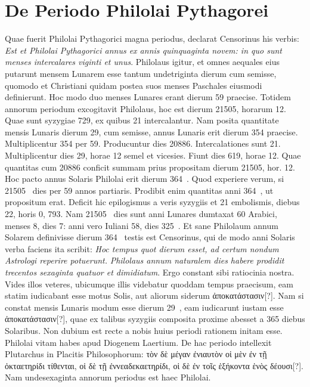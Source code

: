 \section{De Periodo Philolai Pythagorei}
%
Quae fuerit Philolai Pythagorici magna periodus, declarat
Censorinus his verbis: \textit{Est et Philolai Pythagorici annus ex
annis quinquaginta novem: in quo sunt menses intercalares viginti
et unus}.
Philolaus igitur, et omnes aequales eius putarunt mensem
Lunarem esse tantum undetriginta dierum cum semisse, quomodo
et Christiani quidam postea suos menses Paschales eiusmodi definierunt.
Hoc modo duo menses Lunares erant dierum 59 praecise.
Totidem annorum periodum excogitavit Philolaus, hoc est dierum
21505, horarum 12.
Quae sunt syzygiae 729, ex quibus 21 intercalantur.
Nam posita quantitate mensis Lunaris dierum 29, cum semisse,
annus Lunaris erit dierum 354 praecise.
Multiplicentur 354
per 59.
Producuntur dies 20886.
Intercalationes sunt 21.
Multiplicentur
dies 29, horae 12 semel et vicesies.
Fiunt dies 619, horae
12.
Quae quantitas cum 20886 conficit summam prius propositam
dierum 21505, hor. 12. %
Hoc pacto annus Solaris Philolai erit dierum
364~.
Quod experiere verum, si 21505~ dies per 59 annos
partiaris.
Prodibit enim quantitas anni 364~, ut propositum erat.
Deficit hic epilogismus a veris syzygiis et 21 embolismis, diebus
22, horis 0, 793.
Nam 21505~ dies sunt anni Lunares dumtaxat
60 Arabici, menses 8, dies 7: anni vero Iuliani 58, dies 325~.
Et sane Philolaum annum Solarem definivisse dierum 364~
testis est Censorinus, qui de modo anni Solaris verba faciens ita scribit:
\textit{Hoc tempus quot dierum esset, ad certum nondum Astrologi reperire
potuerunt.}
\textit{Philolaus annum naturalem dies habere prodidit trecentos
sexaginta quatuor et dimidiatum}.
Ergo constant sibi ratiocinia nostra.
Vides illos veteres, ubicumque illis videbatur quoddam
tempus praecisum, eam statim iudicabant esse motus Solis,
aut aliorum siderum \textgreek{ἀποκατάστασιν[?]}.
%
Nam si constat mensis Lunaris
modum esse dierum 29~, eam iudicarunt iustam esse
 \textgreek{ἀποκατάστασιν[?]},
quae ex talibus syzygiis composita proxime abesset a 365 diebus Solaribus.
Non dubium est recte a nobis huius periodi rationem initam
esse.
Philolai vitam habes apud Diogenem Laertium.
De hac periodo
intellexit Plutarchus in Placitis Philosophorum: \textgreek{τὸν δὲ μέγαν
ἐνιαυτὸν οἱ μὲν ἐν τῇ ὀκταετηρίδι τίθενται, οἱ δὲ τῇ ἐννεαδεκαετηρίδι, οἱ δὲ
ἐν τοῖς ἑξήκοντα ἑνὸς δέουσι[?]}.
Nam undesexaginta annorum periodus est
haec Philolai.
%
